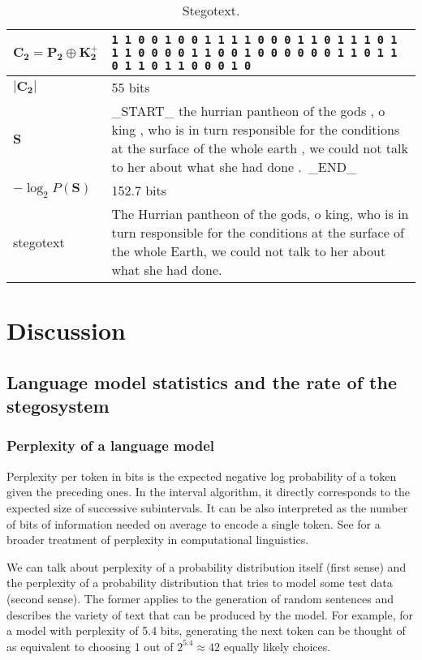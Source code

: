 \documentclass[draft]{IIBproject}
\begin{document}
\begin{table}[h]
	\centering
	\begin{tabular}{m{3cm} m{12cm}}
	\centering $\mathbf{C_2} = \mathbf{P_2} \oplus \mathbf{K^+_2}$ & \footnotesize \texttt{1 1 0 0 1 0 0 1 1 1 1 0 0 0 1 1 0 1 1 1 0 1 1 1 0 0 0 0 1 1 0 0 1 0 0 0 0 0 0 1 1 0 1 1 0 1 1 0 1 1 0 0 0 1 0} \\ \hline
	\centering $| \mathbf{C_2} |$ & 55 bits \\ \hline
	\centering $\mathbf S$ & \_START\_ the hurrian pantheon of the gods , o king , who is in turn responsible for the conditions at the surface of the whole earth , we could not talk to her about what she had done .\ \_END\_ \\ \hline
	\centering $-\log_2 P(\mathbf S)$ & 152.7 bits \\ \hline
	\centering stegotext & The Hurrian pantheon of the gods, o king, who is in turn responsible for the conditions at the surface of the whole Earth, we could not talk to her about what she had done.
	\end{tabular}
	\caption{\label{tab:results_stegotext}Stegotext.}
\end{table}

\renewcommand{\arraystretch}{1}

\clearpage
\section{Discussion}

\subsection{Language model statistics and the rate of the stegosystem}

\subsubsection{Perplexity of a language model}

Perplexity per token in bits is the expected negative log probability of a token given the preceding ones. In the interval algorithm, it directly corresponds to the expected size of successive subintervals. It can be also interpreted as the number of bits of information needed on average to encode a single token. See \cite{brown1992entropy} for a broader treatment of perplexity in computational linguistics.

We can talk about perplexity of a probability distribution itself (first sense) and the perplexity of a probability distribution that tries to model some test data (second sense). The former applies to the generation of random sentences and describes the variety of text that can be produced by the model. For example, for a model with perplexity of 5.4 bits, generating the next token can be thought of as equivalent to choosing 1 out of $2^{5.4} \approx 42$ equally likely choices.
\end{document}
